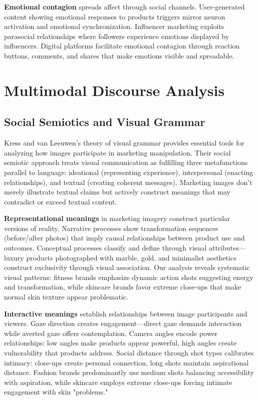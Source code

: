 \textbf{Emotional contagion} spreads affect through social channels. User-generated content showing emotional responses to products triggers mirror neuron activation and emotional synchronization. Influencer marketing exploits parasocial relationships where followers experience emotions displayed by influencers. Digital platforms facilitate emotional contagion through reaction buttons, comments, and shares that make emotions visible and spreadable.

\section{Multimodal Discourse Analysis}
\label{sec:multimodal_theory}

\subsection{Social Semiotics and Visual Grammar}

Kress and van Leeuwen's theory of visual grammar provides essential tools for analyzing how images participate in marketing manipulation. Their social semiotic approach treats visual communication as fulfilling three metafunctions parallel to language: ideational (representing experience), interpersonal (enacting relationships), and textual (creating coherent messages). Marketing images don't merely illustrate textual claims but actively construct meanings that may contradict or exceed textual content.

\textbf{Representational meanings} in marketing imagery construct particular versions of reality. Narrative processes show transformation sequences (before/after photos) that imply causal relationships between product use and outcomes. Conceptual processes classify and define through visual attributes—luxury products photographed with marble, gold, and minimalist aesthetics construct exclusivity through visual association. Our analysis reveals systematic visual patterns: fitness brands emphasize dynamic action shots suggesting energy and transformation, while skincare brands favor extreme close-ups that make normal skin texture appear problematic.

\textbf{Interactive meanings} establish relationships between image participants and viewers. Gaze direction creates engagement—direct gaze demands interaction while averted gaze offers contemplation. Camera angles encode power relationships: low angles make products appear powerful, high angles create vulnerability that products address. Social distance through shot types calibrates intimacy: close-ups create personal connection, long shots maintain aspirational distance. Fashion brands predominantly use medium shots balancing accessibility with aspiration, while skincare employs extreme close-ups forcing intimate engagement with skin "problems."

